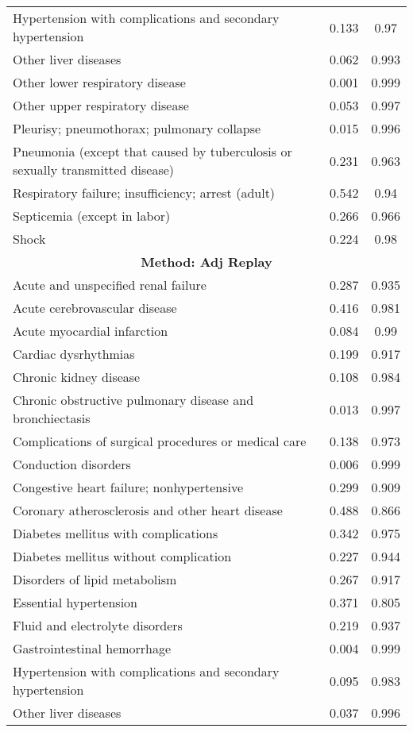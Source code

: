 \documentclass{article}
\begin{document}
\begin{longtable}{lcc}
Hypertension with complications and secondary hypertension & 0.133 & 0.97 \\
Other liver diseases & 0.062 & 0.993 \\
Other lower respiratory disease & 0.001 & 0.999 \\
Other upper respiratory disease & 0.053 & 0.997 \\
Pleurisy; pneumothorax; pulmonary collapse & 0.015 & 0.996 \\
Pneumonia (except that caused by tuberculosis or sexually transmitted disease) & 0.231 & 0.963 \\
Respiratory failure; insufficiency; arrest (adult) & 0.542 & 0.94 \\
Septicemia (except in labor) & 0.266 & 0.966 \\
Shock & 0.224 & 0.98 \\
\midrule
\multicolumn{3}{c}{\textbf{Method: Adj Replay}} \\
\midrule
Acute and unspecified renal failure & 0.287 & 0.935 \\
Acute cerebrovascular disease & 0.416 & 0.981 \\
Acute myocardial infarction & 0.084 & 0.99 \\
Cardiac dysrhythmias & 0.199 & 0.917 \\
Chronic kidney disease & 0.108 & 0.984 \\
Chronic obstructive pulmonary disease and bronchiectasis & 0.013 & 0.997 \\
Complications of surgical procedures or medical care & 0.138 & 0.973 \\
Conduction disorders & 0.006 & 0.999 \\
Congestive heart failure; nonhypertensive & 0.299 & 0.909 \\
Coronary atherosclerosis and other heart disease & 0.488 & 0.866 \\
Diabetes mellitus with complications & 0.342 & 0.975 \\
Diabetes mellitus without complication & 0.227 & 0.944 \\
Disorders of lipid metabolism & 0.267 & 0.917 \\
Essential hypertension & 0.371 & 0.805 \\
Fluid and electrolyte disorders & 0.219 & 0.937 \\
Gastrointestinal hemorrhage & 0.004 & 0.999 \\
Hypertension with complications and secondary hypertension & 0.095 & 0.983 \\
Other liver diseases & 0.037 & 0.996 \\

\end{longtable}
\end{document}
